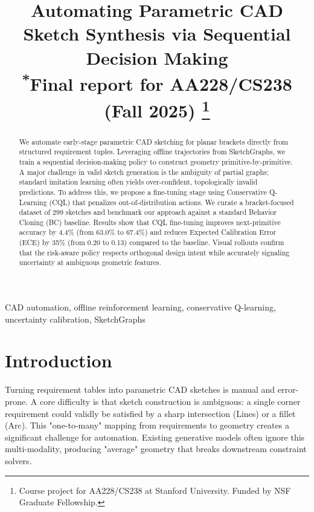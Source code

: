 \documentclass[conference]{IEEEtran}
\begin{document}
\title{Automating Parametric CAD Sketch Synthesis via Sequential Decision Making\\
{\footnotesize \textsuperscript{*}Final report for AA228/CS238 (Fall 2025)}
\thanks{Course project for AA228/CS238 at Stanford University. Funded by NSF Graduate Fellowship.}
}

\author{
}

\maketitle

\begin{abstract}
We automate early-stage parametric CAD sketching for planar brackets directly from structured requirement tuples. Leveraging offline trajectories from SketchGraphs, we train a sequential decision-making policy to construct geometry primitive-by-primitive. A major challenge in valid sketch generation is the ambiguity of partial graphs; standard imitation learning often yields over-confident, topologically invalid predictions. To address this, we propose a fine-tuning stage using Conservative Q-Learning (CQL) that penalizes out-of-distribution actions. We curate a bracket-focused dataset of 299 sketches and benchmark our approach against a standard Behavior Cloning (BC) baseline. Results show that CQL fine-tuning improves next-primitive accuracy by 4.4\% (from 63.0\% to 67.4\%) and reduces Expected Calibration Error (ECE) by 35\% (from 0.20 to 0.13) compared to the baseline. Visual rollouts confirm that the risk-aware policy respects orthogonal design intent while accurately signaling uncertainty at ambiguous geometric features.
\end{abstract}

\begin{IEEEkeywords}
CAD automation, offline reinforcement learning, conservative Q-learning, uncertainty calibration, SketchGraphs
\end{IEEEkeywords}

\section{Introduction}
Turning requirement tables into parametric CAD sketches is manual and error-prone. A core difficulty is that sketch construction is ambiguous: a single corner requirement could validly be satisfied by a sharp intersection (Lines) or a fillet (Arc). This "one-to-many" mapping from requirements to geometry creates a significant challenge for automation. Existing generative models often ignore this multi-modality, producing "average" geometry that breaks downstream constraint solvers.
\end{document}
